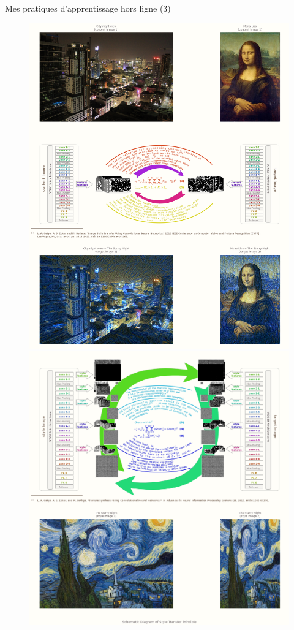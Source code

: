 \documentclass{beamer}
\begin{document}
	\begin{frame}[fragile]{Mes pratiques d'apprentissage hors ligne (3)}
		\begin{figure}[!htb]
			\vspace{-.25em}
			\centering\includegraphics[width=\linewidth]{images/deep_learning_4_1.png}
			\endminipage\hfill
			\centering\includegraphics[width=\linewidth]{images/deep_learning_4_2.png}

\end{figure}
\end{frame}
\end{document}
